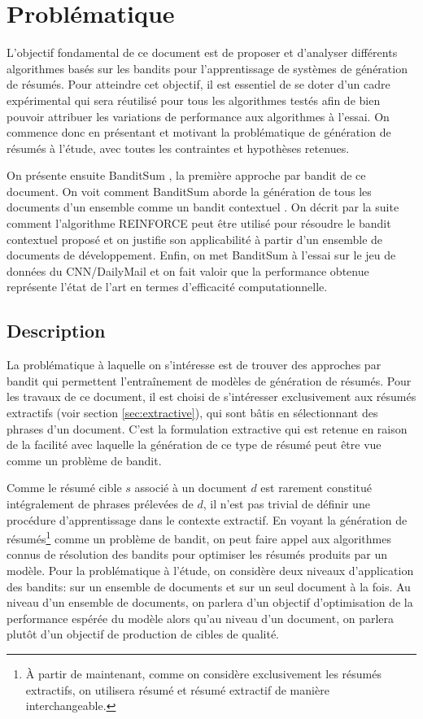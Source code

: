 \chapter{Problématique}
\label{chap:bandit_contextuel}

L'objectif fondamental de ce document est de proposer et 
d'analyser différents algorithmes basés 
sur les bandits pour l'apprentissage de systèmes de génération 
de résumés.
Pour atteindre cet objectif, il est essentiel de se doter 
d'un cadre expérimental qui sera réutilisé pour tous les algorithmes
testés afin de bien pouvoir attribuer les variations de performance 
aux algorithmes à l'essai.
On commence donc en présentant et motivant 
la problématique de génération de résumés à l'étude, avec toutes 
les contraintes et hypothèses retenues.

On présente ensuite BanditSum \citep{dong2018banditsum}, la première 
approche par bandit de ce document.
On voit comment BanditSum aborde la génération de tous les documents 
d'un ensemble comme un bandit contextuel \citep{contextual_bandits}.
On décrit par la suite comment l'algorithme REINFORCE \citep{williams1992simple} 
peut être utilisé pour résoudre le bandit contextuel proposé et 
on justifie son applicabilité à partir d'un ensemble de documents de développement.
Enfin, on met BanditSum à l'essai sur le jeu de données du CNN/DailyMail \citep{hermann2015teaching}  
et on fait valoir que la performance obtenue représente l'état de l'art
en termes d'efficacité computationnelle.

\section{Description}
\label{section:problematique}

La problématique à laquelle on s'intéresse est de trouver 
des approches par bandit qui permettent l'entraînement 
de modèles de génération de résumés.
Pour les travaux de ce document, il est choisi de s'intéresser exclusivement
aux résumés extractifs (voir section \ref{sec:extractive}), qui sont bâtis
en sélectionnant des phrases d'un document.
C'est la formulation extractive qui est retenue 
en raison de la facilité avec laquelle la génération de ce type 
de résumé peut être vue comme un problème de bandit.

Comme le résumé cible $s$ associé à un document $d$ est 
rarement constitué intégralement de phrases prélevées de $d$, il n'est pas trivial 
de définir une procédure d'apprentissage dans le contexte extractif.
En voyant la génération de résumés\footnote{À partir de maintenant, comme on considère exclusivement les 
résumés extractifs, on utilisera résumé et résumé extractif
de manière interchangeable.} comme un problème de bandit, on peut faire appel 
aux algorithmes connus de résolution des bandits pour 
optimiser les résumés produits par un modèle.
Pour la problématique à l'étude, on considère deux niveaux d'application des bandits: 
sur un ensemble de documents et sur un seul document à la fois.
Au niveau d'un ensemble de documents,
on parlera d'un objectif d'optimisation de la performance espérée du modèle 
alors qu'au niveau d'un document, on parlera plutôt d'un objectif de production 
de cibles de qualité.

